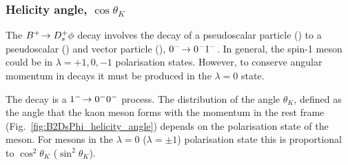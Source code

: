 


\subsubsection{Helicity angle, $\cos\theta_{K}$} 

The ${{{B}^+}}\!\rightarrow {\ensuremath{{D}^+_{s}}}\phi$ decay involves the decay of a pseudoscalar particle (\Bp) to a pseudoscalar (\Dsp) and vector particle (\phiz), $0^{-}\!\rightarrow 0^{-}1^{-}$. In general, the spin-1 \phiz meson could be in $\lambda= +1,0,-1$ polarisation states. However, to conserve angular momentum in \decay{\Bp}{\Dsp\phiz} decays it must be produced in the $\lambda = 0$ state. 

The decay  \decay{\phiz}{\Kp\Km} is a $1^{-}\!\rightarrow 0^{-}0^{-}$ process. 
The distribution of the angle $\theta_{K}$, defined as the angle that the kaon meson forms with the \Bp momentum in the \phiz rest frame (Fig.~\ref{fig:B2DsPhi_helicity_angle}) depends on the polarisation state of the \phiz meson. For \phiz mesons in the $\lambda = 0$ ($\lambda = \pm1$) polarisation state this is proportional to $\cos^{2}{\theta_{K}}$ ($\sin^{2}{\theta_{K}}$).



